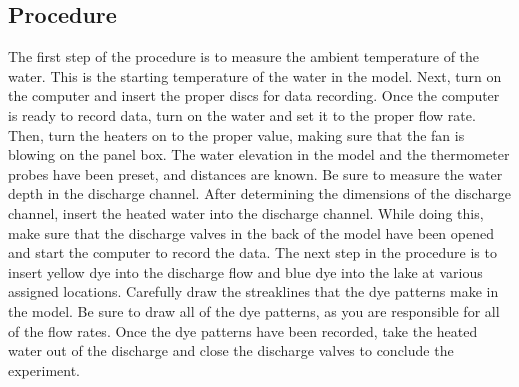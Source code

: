 \documentclass{article}
\begin{document}
\subsection{Procedure}
\par The first step of the procedure is to measure the ambient temperature of the water. This is the starting temperature of the water in the model. Next, turn on the computer and insert the proper discs for data recording. Once the computer is ready to record data, turn on the water and set it to the proper flow rate. Then, turn the heaters on to the proper value, making sure that the fan is blowing on the panel box. The water elevation in the model and the thermometer probes have been preset, and distances are known. Be sure to measure the water depth in the discharge channel. After determining the dimensions of the discharge channel, insert the heated water into the discharge channel. While doing this, make sure that the discharge valves in the back of the model have been opened and start the computer to record the data. The next step in the procedure is to insert yellow dye into the discharge flow and blue dye into the lake at various assigned locations. Carefully draw the streaklines that the dye patterns make in the model. Be sure to draw all of the dye patterns, as you are responsible for all of the flow rates. Once the dye patterns have been recorded, take the heated water out of the discharge and close the discharge valves to conclude the experiment.
\newpage
\end{document}
